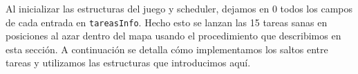 Al inicializar las estructuras del juego y scheduler, dejamos en 0 todos los campos de cada entrada en \verb|tareasInfo|. Hecho esto se lanzan las 15 tareas sanas en posiciones al azar dentro del mapa usando el procedimiento que describimos en esta sección. A continuación se detalla cómo implementamos los saltos entre tareas y utilizamos las estructuras que introducimos aquí.






\begin{comment}
4.6.
Ejercicio 6


a) Definir las entradas en la GDT que considere necesarias para ser usadas como descriptores
de TSS. Minimamente, una para ser utilizada por la tarea inicial y otra para la tarea
Idle. Sugerencia: Hacer una función para obtener entradas libres en la gdt.


b) Completar la entrada de la TSS de la tarea Idle con la información de la tarea Idle. Esta
información se encuentra en el archivo TSS.C. La tarea Idle se encuentra en la dirección
0x00010000. La pila se alojará en la misma dirección que la pila del kernel y será mapeada
con identity mapping. Esta tarea ocupa 1 pagina de 4KB y debe ser “mapeada” con identity
mapping. Además la misma debe compartir el mismo CR3 que el kernel.


c) Construir una función que complete una TSS libre con los datos correspondientes a una
tarea. El código de las tareas se encuentra a partir de la dirección 0x00011000 ocupando
una pagina de 4kb cada una según indica la figura 1. Para la dirección de la pila de
nivel 3 se debe utilizar el mismo espacio de la tarea, la misma crecerá desde la base de
la tarea. Para el mapa de memoria se debe construir uno nuevo utilizando la función
mmu inicializar dir tarea. Además, tener en cuenta que cada tarea utilizará una pila
distinta de nivel 0, para esto se debe pedir una nueva pagina libre a tal fin.


d) Completar la entrada de la GDT correspondiente a la tarea inicial.


e) Completar la entrada de la GDT correspondiente a la tarea Idle.


f) Escribir el código necesario para ejecutar la tarea Idle, es decir, saltar intercambiando las
TSS, entre la tarea inicial y la tarea Idle.

\end{comment}